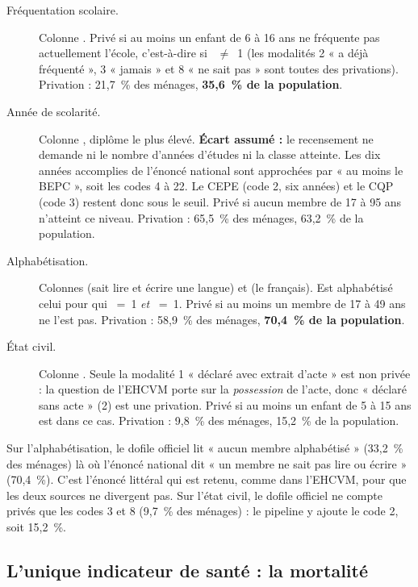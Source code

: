 \documentclass[11pt,a4paper]{article}
\begin{document}
\begin{description}
  \item[Fréquentation scolaire.] Colonne . Privé si au moins un enfant de 6 à 16 ans
  ne fréquente pas actuellement l'école, c'est-à-dire si ~$\neq$~1 (les modalités 2
  « a déjà fréquenté », 3 « jamais » et 8 « ne sait pas » sont toutes des privations).
  Privation : 21,7~\% des ménages, \textbf{35,6~\% de la population}.

  \item[Année de scolarité.] Colonne , diplôme le plus élevé. \textbf{Écart assumé :}
  le recensement ne demande ni le nombre d'années d'études ni la classe atteinte. Les dix années
  accomplies de l'énoncé national sont approchées par « au moins le BEPC », soit les codes 4 à
  22. Le CEPE (code 2, six années) et le CQP (code 3) restent donc sous le seuil. Privé si aucun
  membre de 17 à 95 ans n'atteint ce niveau. Privation : 65,5~\% des ménages, 63,2~\% de la
  population.

  \item[Alphabétisation.] Colonnes  (sait lire et écrire une langue) et 
  (le français). Est alphabétisé celui pour qui ~=~1 \emph{et} ~=~1.
  Privé si au moins un membre de 17 à 49 ans ne l'est pas. Privation : 58,9~\% des ménages,
  \textbf{70,4~\% de la population}.

  \item[État civil.] Colonne . Seule la modalité 1 « déclaré avec extrait d'acte » est
  non privée : la question de l'EHCVM porte sur la \emph{possession} de l'acte, donc « déclaré
  sans acte » (2) est une privation. Privé si au moins un enfant de 5 à 15 ans est dans ce cas.
  Privation : 9,8~\% des ménages, 15,2~\% de la population.
\end{description}

\begin{attention}
Sur l'alphabétisation, le dofile officiel lit « aucun membre alphabétisé » (33,2~\% des
ménages) là où l'énoncé national dit « un membre ne sait pas lire ou écrire » (70,4~\%). C'est
l'énoncé littéral qui est retenu, comme dans l'EHCVM, pour que les deux sources ne divergent
pas. Sur l'état civil, le dofile officiel ne compte privés que les codes 3 et 8 (9,7~\% des
ménages) : le pipeline y ajoute le code 2, soit 15,2~\%.
\end{attention}

\subsection{L'unique indicateur de santé : la mortalité}
\end{document}
